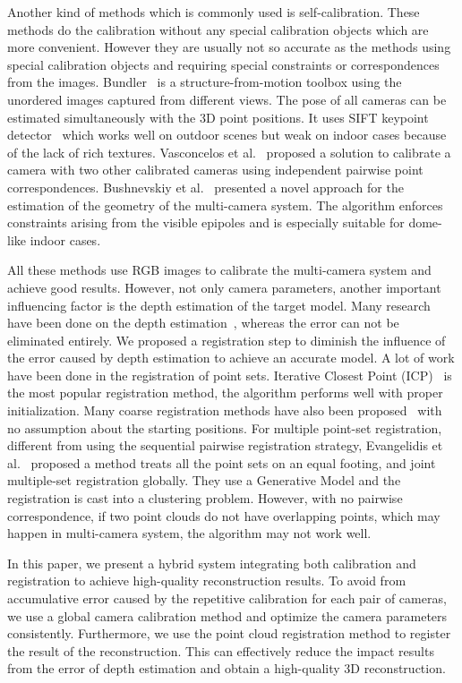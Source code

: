 Another kind of methods which is commonly used is self-calibration. These methods do the calibration without any special calibration objects which are more convenient. However they are usually not so accurate as the methods using special calibration objects and requiring special constraints or correspondences from the images.
Bundler~\cite{snavely2006photo} is a structure-from-motion toolbox using the unordered images captured from different views. The pose of all cameras can be estimated simultaneously with the 3D point positions.
It uses SIFT keypoint detector~\cite{lowe2004distinctive} which works well on outdoor scenes but weak on indoor cases because of the lack of rich textures.
Vasconcelos et al.~\cite{vasconcelos2012minimal} proposed a solution to calibrate a camera with two other calibrated cameras using independent pairwise point correspondences.
Bushnevskiy et al.~\cite{bushnevskiy2016multicamera} presented a novel approach for the estimation of the geometry of the multi-camera system. The algorithm enforces constraints arising from the visible epipoles and is especially suitable for dome-like indoor cases.

All these methods use RGB images to calibrate the multi-camera system and achieve good results. However, not only camera parameters, another important influencing factor is the depth estimation of the target model. Many research have been done on the depth estimation~\cite{scharstein,Bleyer2011PatchMatch}, whereas the error can not be eliminated entirely.
We proposed a registration step to diminish the influence of the error caused by depth estimation to achieve an accurate model.
A lot of work have been done in the registration of point sets. 
Iterative Closest Point (ICP)~\cite{Besl1992A} is the most popular registration method, the algorithm performs well with proper initialization.
Many coarse registration methods have also been proposed~\cite{Aiger:2008:CSR:1360612.1360684,5152473} with no assumption about the starting positions.
For multiple point-set registration, different from using the sequential pairwise registration strategy, Evangelidis et al.~\cite{Evangelidis-ECCV-2014} proposed a method treats all the point sets on an equal footing, and joint multiple-set registration globally. They use a Generative Model and the registration is cast into a clustering problem. However, with no pairwise correspondence, if two point clouds do not have overlapping points, which may happen in multi-camera system, the algorithm may not work well.

In this paper, we present a hybrid system integrating both calibration and registration to achieve high-quality reconstruction results. To avoid from accumulative error caused by the repetitive calibration for each pair of cameras, we use a global camera calibration method and optimize the camera parameters consistently. Furthermore, we use the point cloud registration method to register the result of the reconstruction. This can effectively reduce the impact results from the error of depth estimation and obtain a high-quality 3D reconstruction.






